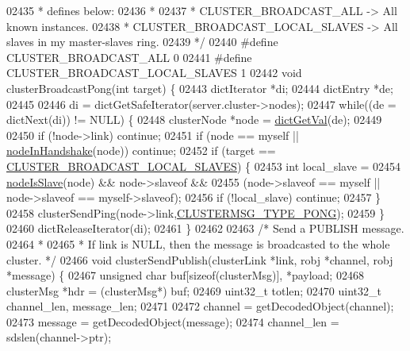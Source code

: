 \begin{DoxyCode}
{{{{{{{{{{{{{{{{{{{{{{{{{{{{{{{{{{{{{{{{02435 \textcolor{comment}{ * defines below:}
02436 \textcolor{comment}{ *}
02437 \textcolor{comment}{ * CLUSTER\_BROADCAST\_ALL -> All known instances.}
02438 \textcolor{comment}{ * CLUSTER\_BROADCAST\_LOCAL\_SLAVES -> All slaves in my master-slaves ring.}
02439 \textcolor{comment}{ */}
02440 \textcolor{preprocessor}{#}\textcolor{preprocessor}{define} \textcolor{preprocessor}{CLUSTER\_BROADCAST\_ALL} 0
02441 \textcolor{preprocessor}{#}\textcolor{preprocessor}{define} \textcolor{preprocessor}{CLUSTER\_BROADCAST\_LOCAL\_SLAVES} 1
02442 \textcolor{keywordtype}{void} clusterBroadcastPong(\textcolor{keywordtype}{int} target) \{
02443     dictIterator *di;
02444     dictEntry *de;
02445 
02446     di = dictGetSafeIterator(server.cluster->nodes);
02447     \textcolor{keywordflow}{while}((de = dictNext(di)) != NULL) \{
02448         clusterNode *node = \hyperlink{dict_8h_ae8d2cc391873b2bea2b87c4f80f43120}{dictGetVal}(de);
02449 
02450         \textcolor{keywordflow}{if} (!node->link) \textcolor{keywordflow}{continue};
02451         \textcolor{keywordflow}{if} (node == myself || \hyperlink{cluster_8h_a70f1a5bb82f54ce5d17b13de42176790}{nodeInHandshake}(node)) \textcolor{keywordflow}{continue};
02452         \textcolor{keywordflow}{if} (target == \hyperlink{cluster_8c_a49481f5cedbd75ce025011b331021822}{CLUSTER\_BROADCAST\_LOCAL\_SLAVES}) \{
02453             \textcolor{keywordtype}{int} local\_slave =
02454                 \hyperlink{cluster_8h_a3c99881f6892130c902b42b1f84a0e11}{nodeIsSlave}(node) && node->slaveof &&
02455                 (node->slaveof == myself || node->slaveof == myself->slaveof);
02456             \textcolor{keywordflow}{if} (!local\_slave) \textcolor{keywordflow}{continue};
02457         \}
02458         clusterSendPing(node->link,\hyperlink{cluster_8h_a33e9439f462f28177a31dfc74de0c16b}{CLUSTERMSG\_TYPE\_PONG});
02459     \}
02460     dictReleaseIterator(di);
02461 \}
02462 
02463 \textcolor{comment}{/* Send a PUBLISH message.}
02464 \textcolor{comment}{ *}
02465 \textcolor{comment}{ * If link is NULL, then the message is broadcasted to the whole cluster. */}
02466 \textcolor{keywordtype}{void} clusterSendPublish(clusterLink *link, robj *channel, robj *message) \{
02467     \textcolor{keywordtype}{unsigned} \textcolor{keywordtype}{char} buf[\textcolor{keyword}{sizeof}(clusterMsg)], *payload;
02468     clusterMsg *hdr = (clusterMsg*) buf;
02469     uint32\_t totlen;
02470     uint32\_t channel\_len, message\_len;
02471 
02472     channel = getDecodedObject(channel);
02473     message = getDecodedObject(message);
02474     channel\_len = sdslen(channel->ptr);
}}}}}}}}}}}}}}}}}}}}}}}}}}}}}}}}}}}}}}}}
\end{DoxyCode}
